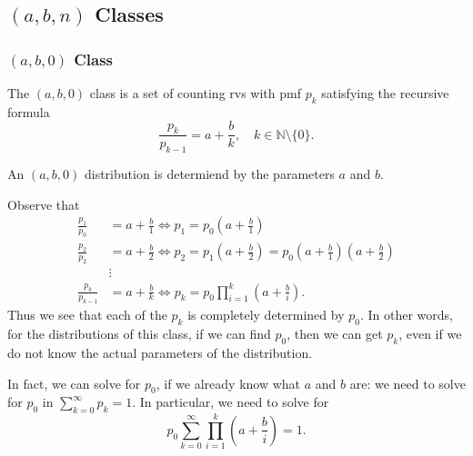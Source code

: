 \documentclass[notoc,notitlepage]{tufte-book}
\begin{document}
\subsection{$(a, b, n)$ Classes}%
\label{sub:a_b_n_classes}

\subsubsection{$(a, b, 0)$ Class}%
\label{ssub:a_b_0_class}

\begin{defn}[$(a, b, 0)$ Class]\label{defn:a_b_0_class}
  The $(a, b, 0)$ class is a set of counting rvs with pmf $p_k$ satisfying the recursive formula
  \begin{equation*}
    \frac{p_k}{p_{k - 1}} = a + \frac{b}{k}, \quad k \in \mathbb{N} \setminus \{ 0 \}.
  \end{equation*}
\end{defn}

\begin{remark}
  An $(a, b, 0)$ distribution is determiend by the parameters $a$ and $b$.
\end{remark}

\begin{note}
  Observe that
  \begin{align*}
    \frac{p_1}{p_0} &= a + \frac{b}{1} \iff p_1 = p_0 \left( a + \frac{b}{1} \right) \\
    \frac{p_2}{p_2} &= a + \frac{b}{2} \iff p_2 = p_1 \left( a + \frac{b}{2} \right) = p_0 \left( a + \frac{b}{1} \right)\left( a + \frac{b}{2} \right) \\
                    &\vdots \\
    \frac{p_k}{p_{k - 1}} &= a + \frac{b}{k} \iff p_k = p_0 \prod_{i=1}^{k} \left( a + \frac{b}{i} \right).
  \end{align*}
  Thus we see that each of the $p_k$ is completely determined by $p_0$. In other words, for the distributions of this class, if we can find $p_0$, then we can get $p_k$, even if we do not know the actual parameters of the distribution.

  In fact, we can solve for $p_0$, if we already know what $a$ and $b$ are: we need to solve for $p_0$ in $\sum_{k=0}^{\infty} p_k = 1$. In particular, we need to solve for
  \begin{equation*}
    p_0 \sum_{k=0}^{\infty} \prod_{i=1}^{k} \left( a + \frac{b}{i} \right) = 1.
  \end{equation*}
\end{note}
\end{document}
